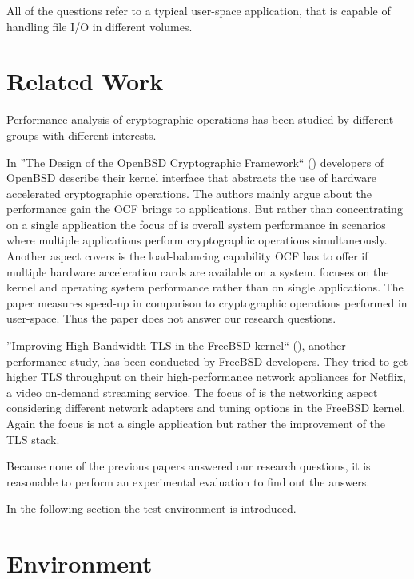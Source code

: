 All of the questions refer to a typical user-space application, that is capable of handling file I/O in different volumes.

\section{Related Work}\label{relatedwork}

Performance analysis of cryptographic operations has been studied by different groups with different interests.

In ''The Design of the OpenBSD Cryptographic Framework`` (\cite{ocf}) developers of OpenBSD describe their kernel interface that abstracts the use of hardware accelerated cryptographic operations.
The authors mainly argue about the performance gain the OCF brings to applications.
But rather than concentrating on a single application the focus of \cite{ocf} is overall system performance in scenarios where multiple applications perform cryptographic operations simultaneously.
Another aspect \cite{ocf} covers is the load-balancing capability OCF has to offer if multiple hardware acceleration cards are available on a system.
\cite{ocf} focuses on the kernel and operating system performance rather than on single applications.
The paper measures speed-up in comparison to cryptographic operations performed in user-space.
Thus the paper does not answer our research questions.

''Improving High-Bandwidth TLS in the FreeBSD kernel`` (\cite{freebsdtls}), another performance study, has been conducted by FreeBSD developers.
They tried to get higher TLS throughput on their high-performance network appliances for Netflix, a video on-demand streaming service.
The focus of \cite{freebsdtls} is the networking aspect considering different network adapters and tuning options in the FreeBSD kernel.
Again the focus is not a single application but rather the improvement of the TLS stack.


Because none of the previous papers answered our research questions, it is reasonable to perform an experimental evaluation to find out the answers.

In the following section the test environment is introduced.

\section{Environment}

